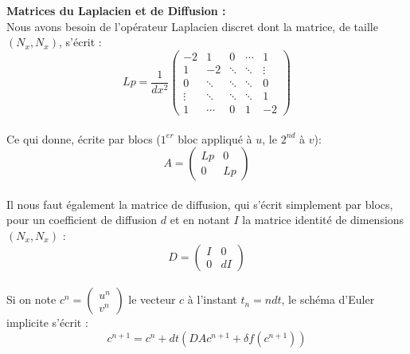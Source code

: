 \documentclass[12pt,a4paper]{article}
\begin{document}
\textbf{Matrices du Laplacien et de Diffusion :}\\
Nous avons besoin de l'op\'erateur Laplacien discret dont la matrice, de taille  $(N_x, N_x)$, s'\'ecrit  : \\
\begin{displaymath}
Lp = \frac{1}{dx^2} \begin{pmatrix} 
-2     & 1     & 0      & \cdots & 1\\
 1     & -2    & \ddots & \ddots & \vdots\\
 0     &\ddots & \ddots & \ddots & 0\\
\vdots & \ddots& \ddots & \ddots & 1\\
1      &\cdots & 0      &    1   & -2
\end{pmatrix}
\end{displaymath}\\

Ce qui donne, \'ecrite par blocs ($1^{er}$ bloc appliqu\'e \`a $u$, le $2^{nd}$ \`a $v$):\\
\begin{displaymath}
A = \begin{pmatrix} 
Lp  & 0 \\
 0  & Lp
\end{pmatrix}
\end{displaymath}\\

Il nous faut \'egalement la matrice de diffusion, qui s'\'ecrit simplement par blocs, pour un coefficient de diffusion $d$ et en notant $I$ la matrice identit\'e de dimensions $(N_x, N_x)$ :\\
\begin{displaymath}
D = \begin{pmatrix} 
I  & 0 \\
 0  & dI
\end{pmatrix}
\end{displaymath}\\

Si on note $c^n = \begin{pmatrix} u^n \\ v^n \end{pmatrix}$ le vecteur $c$ \`a l'instant $t_n = n dt$, le sch\'ema d'Euler implicite s'\'ecrit :\\
\begin{equation}
c^{n+1} = c^n + dt (DA c^{n+1} + \delta f(c^{n+1}))
\end{equation}\\
\end{document}
